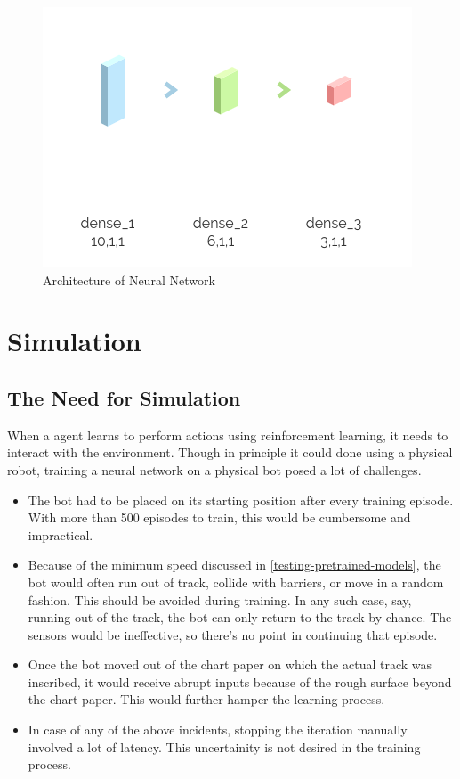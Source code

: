 \documentclass[12pt]{extreport}
\theoremstyle{plain}
\theoremstyle{definition}
\begin{document}
\begin{figure}[htb]
    \includegraphics{net}
    \caption{Architecture of Neural Network}
\end{figure}

\chapter{Simulation} \label{simulation}

\section{The Need for Simulation} \label{need-for-simulation}
When a agent learns to perform actions using reinforcement learning, it
needs to interact with the environment. Though in principle it could
done using a physical robot, training a neural network on a physical bot posed
a lot of challenges.

\begin{itemize}
 \item The bot had to be placed on its starting position after every training episode. With more than 500 episodes to train, this would be cumbersome and impractical.
 \item Because of the minimum speed discussed in \autoref{testing-pretrained-models}, the bot would often run out of track, collide with barriers, or move in a random fashion. This should be avoided during training. In any such case, say, running out of the track, the bot can only return to the track by chance. The sensors would be ineffective, so there's no point in continuing that episode.
 \item Once the bot moved out of the chart paper on which the actual track was inscribed, it would receive abrupt inputs because of the rough surface beyond the chart paper. This would further hamper the learning process.
 \item In case of any of the above incidents, stopping the iteration manually involved a lot of latency. This uncertainity is not desired in the training process.
\end{itemize}
\end{document}
